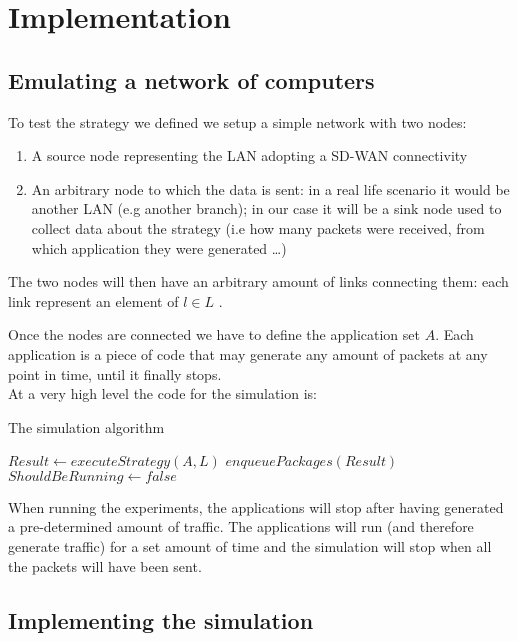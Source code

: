 
\section{Implementation}

\subsection{Emulating a network of computers}


To test the strategy we defined we setup a simple network with two nodes:
\begin{enumerate}
	\item A source node representing the LAN adopting a SD-WAN connectivity
	\item An arbitrary node to which the data is sent: in a real life scenario it would be another LAN (e.g another branch); in our case it will be a sink node used to collect data about the strategy (i.e how many packets were received, from which application they were generated \dots)  
\end{enumerate}

The two nodes will then have an arbitrary amount of links connecting them: each link represent an element of $l \in L$ .

Once the nodes are connected we have to define the application set $A$.
Each application is a piece of code that may generate any amount of packets at any point in time, until it finally stops.\\

At a very high level the code for the simulation is:

\begin{algorithm}
	\caption{The simulation algorithm}\label{alg:simulation}
	\begin{algorithmic}
		\State $Result \gets executeStrategy(A, L)$
		\State $enqueuePackages(Result)$
		\State $ShouldBeRunning \gets false$
		\EndIf
		\EndWhile
	\end{algorithmic}
\end{algorithm}

When running the experiments, the applications will stop after having generated a pre-determined amount of traffic. The applications will run (and therefore generate traffic) for a set amount of time and the simulation will stop when all the packets will have been sent.

\subsection{Implementing the simulation}

